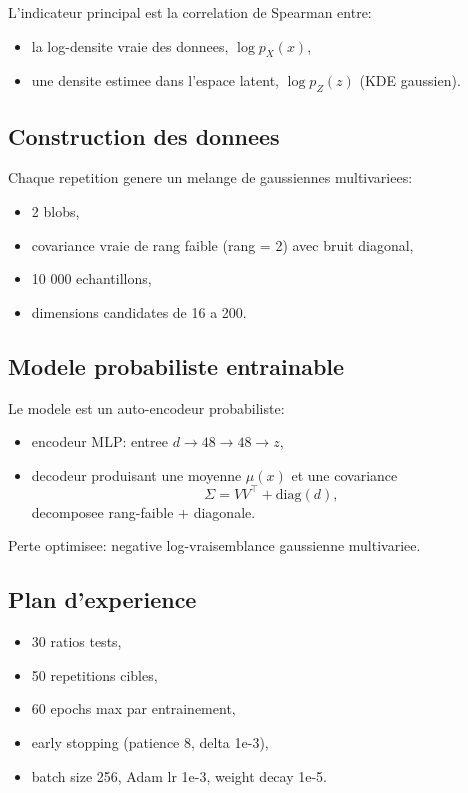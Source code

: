 \documentclass[11pt,a4paper]{article}
\begin{document}
L'indicateur principal est la correlation de Spearman entre:
\begin{itemize}[leftmargin=1.2cm]
    \item la log-densite vraie des donnees, $\log p_X(x)$,
    \item une densite estimee dans l'espace latent, $\log p_Z(z)$ (KDE gaussien).
\end{itemize}

\subsection{Construction des donnees}
Chaque repetition genere un melange de gaussiennes multivariees:
\begin{itemize}[leftmargin=1.2cm]
    \item 2 blobs,
    \item covariance vraie de rang faible (rang = 2) avec bruit diagonal,
    \item 10 000 echantillons,
    \item dimensions candidates de 16 a 200.
\end{itemize}

\subsection{Modele probabiliste entrainable}
Le modele est un auto-encodeur probabiliste:
\begin{itemize}[leftmargin=1.2cm]
    \item encodeur MLP: entree $d \to 48 \to 48 \to z$,
    \item decodeur produisant une moyenne $\mu(x)$ et une covariance
    \begin{equation}
    \Sigma = VV^\top + \mathrm{diag}(d),
    \end{equation}
    decomposee rang-faible + diagonale.
\end{itemize}

Perte optimisee: negative log-vraisemblance gaussienne multivariee.

\subsection{Plan d'experience}
\begin{itemize}[leftmargin=1.2cm]
    \item 30 ratios tests,
    \item 50 repetitions cibles,
    \item 60 epochs max par entrainement,
    \item early stopping (patience 8, delta 1e-3),
    \item batch size 256, Adam lr 1e-3, weight decay 1e-5.
\end{itemize}
\end{document}
